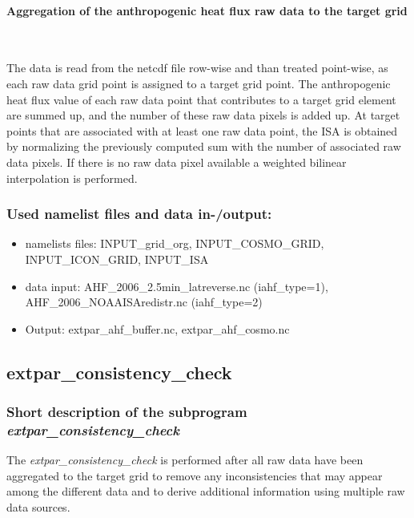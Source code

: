 \documentclass[a4paper,10pt,DIV14,BCOR1cm,titlepage,twoside]{scrartcl}
\begin{document}
\paragraph{Aggregation of the anthropogenic heat flux raw data to the target grid} \ \par\medskip\noindent
The data is read from the netcdf file row-wise and than treated point-wise, as each raw data grid point is assigned to a target grid point. The anthropogenic heat flux value of each raw data point that contributes to a target grid element are summed up, and the number of these raw data pixels is added up. At target points that are associated with at least one raw data point, the ISA is obtained by normalizing the previously computed sum with the number of associated raw data pixels. If there is no raw data pixel available a weighted bilinear interpolation is performed.\par\medskip\noindent
\subsubsection{Used namelist files and data in-/output:}
\begin{itemize}
 \item namelists files: INPUT\_grid\_org, INPUT\_COSMO\_GRID, INPUT\_ICON\_GRID, INPUT\_ISA
 \item data input: AHF\_2006\_2.5min\_latreverse.nc (iahf\_type=1), AHF\_2006\_NOAAISAredistr.nc (iahf\_type=2)
 \item Output: extpar\_ahf\_buffer.nc,  extpar\_ahf\_cosmo.nc
\end{itemize}


\subsection{extpar\_consistency\_check}\label{extpar_consistency_check}
\subsubsection{Short description of the subprogram \textit{extpar\_consistency\_check}}
The \textit{extpar\_consistency\_check} is performed after all raw data have been aggregated to the target grid to remove any inconsistencies that may appear among the different data and to derive additional information using multiple raw data sources.\par\medskip\noindent
\end{document}
